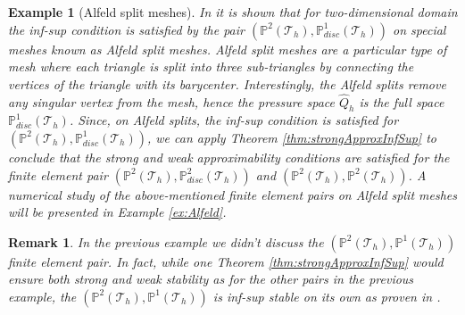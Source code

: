 \documentclass[USenglish]{article}
\theoremstyle{dgthm}
\theoremstyle{dgdef}
\newtheorem{example}{Example}
\newtheorem{remark}{Remark}
\begin{document}
\begin{example}[Alfeld split meshes]
  In \cite{ArnoldQin, FuGuzmanNeilan} it is shown that for two-dimensional domain the inf-sup condition is satisfied by the pair $\left(\mathbb{P}^2(\mathcal{T}_h),\mathbb{P}^1_{disc}(\mathcal{T}_h)\right)$ on special meshes known as Alfeld split meshes.
  Alfeld split meshes are a particular type of mesh where each triangle is split into three sub-triangles by connecting the vertices of the triangle with its barycenter.
  Interestingly, the Alfeld splits remove any singular vertex from the mesh, hence the pressure space $\hat{Q}_h$ is the full space $\mathbb{P}^1_{disc}(\mathcal{T}_h)$.
  Since, on Alfeld splits, the inf-sup condition is satisfied for $\left(\mathbb{P}^2(\mathcal{T}_h),\mathbb{P}^1_{disc}(\mathcal{T}_h)\right)$, we can apply Theorem \ref{thm:strongApproxInfSup} to conclude that the strong and weak approximability conditions are satisfied for the finite element pair $\left(\mathbb{P}^2(\mathcal{T}_h),\mathbb{P}^2_{disc}(\mathcal{T}_h)\right)$ and $\left(\mathbb{P}^2(\mathcal{T}_h),\mathbb{P}^2(\mathcal{T}_h)\right)$.
  A numerical study of the above-mentioned finite element pairs on Alfeld split meshes will be presented in Example \ref{ex:Alfeld}.
\end{example}
\begin{remark}
  In the previous example we didn't discuss the $\left(\mathbb{P}^2(\mathcal{T}_h),\mathbb{P}^1(\mathcal{T}_h)\right)$ finite element pair. In fact, while one Theorem \ref{thm:strongApproxInfSup} would ensure both strong and weak stability as for the other pairs in the previous example, the $\left(\mathbb{P}^2(\mathcal{T}_h),\mathbb{P}^1(\mathcal{T}_h)\right)$ is inf-sup stable on its own as proven in \cite{Boffi, HoodTaylor}.
\end{remark}
\end{document}
